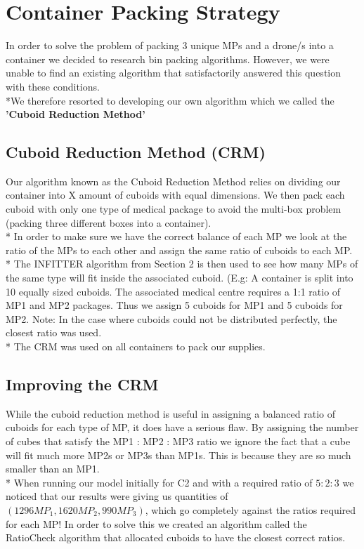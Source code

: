 \documentclass[a4paper,12pt]{article}
\begin{document}
\section{Container Packing Strategy}
In order to solve the problem of packing 3 unique MPs and a drone/s into a container we decided to research bin packing algorithms.
However, we were unable to find an existing algorithm that satisfactorily answered this question with these conditions.
\\*We therefore resorted to developing our own algorithm which we called the \bf{'Cuboid Reduction Method'} 

\subsection{Cuboid Reduction Method (CRM)}
Our algorithm known as the Cuboid Reduction Method relies on dividing our container into X amount of cuboids with equal dimensions. We then pack each cuboid with only one
type of medical package to avoid the multi-box problem (packing three different boxes into a container).\\* In order to make sure we have the correct balance of each MP we
look at the ratio of the MPs to each other and assign the same ratio of cuboids to each MP.\\*
The INFITTER algorithm from Section 2 is then used to see how many MPs of the same type will fit inside the associated cuboid.
(E.g: A container is split into 10 equally sized cuboids. The associated medical centre requires a 1:1 ratio of MP1 and MP2 packages. Thus we assign 5 cuboids for MP1 and 5 cuboids for MP2.
Note: In the case where cuboids could not be distributed perfectly, the closest ratio was used.
\\*
The CRM was used on all containers to pack our supplies.

\subsection{Improving the CRM}
While the cuboid reduction method is useful in assigning a balanced ratio of cuboids for each type of MP, it does have a serious flaw. By assigning the number of cubes that satisfy the MP1 : MP2 : MP3
ratio we ignore the fact that a cube will fit much more MP2s or MP3s than MP1s. This is because they are so much smaller than an MP1.\\*
When running our model initially for C2 and with a required ratio of $5:2:3$  we noticed that our results were giving us quantities of $(1296MP_1, 1620MP_2,990MP_3)$, which go completely against the ratios required for each MP!
In order to solve this we created an algorithm called the RatioCheck algorithm that allocated cuboids to have the closest correct ratios.
\end{document}
